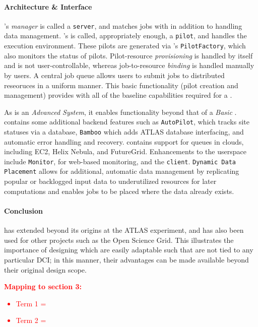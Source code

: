 \documentclass{sig-alternate}
\begin{document}
\paragraph{Architecture \& Interface}
\panda's \textit{manager} is called a \texttt{\panda server}, and matches
jobs with \pilots in addition to handling data management.
\panda's \textit{\pilot}
is called, appropriately enough, a \texttt{pilot}, and handles the execution
environment.  These pilots are generated via \panda's \texttt{PilotFactory},
which also monitors the status of pilots.
Pilot-resource \textit{provisioning} is handled by \panda itself and is not
user-controllable, whereas job-to-resource \textit{binding} is handled
manually by users.
A central job queue allows users to submit jobs
to distributed reseoruces in a uniform manner.  
This basic functionality (pilot creation and management) provides
\panda with all of the baseline capabilities required for a \pilotjob.

As \panda is an \textit{Advanced \pilotjob System}, it enables functionality
beyond that of a \textit{Basic \pilotjob}.
\panda contains some additional backend features such as \texttt{AutoPilot}, which
tracks site statuses via a database, \texttt{Bamboo} which adds
ATLAS database interfacing, and automatic error handling and recovery.
\panda contains support for queues in clouds, including EC2, Helix Nebula,
and FutureGrid.
Enhancements to the userspace include
\texttt{Monitor}, for web-based monitoring, and the \texttt{\panda client}.
\texttt{\panda Dynamic Data Placement} \cite{maeno_pd2p:_2012}
allows for additional, automatic data
management by replicating popular or backlogged input data to underutilized resources
for later computations and enables jobs to be placed where the data
already exists.


\paragraph{\panda Conclusion}
\panda has extended beyond its origins at the ATLAS experiment, and has also been used for other projects such
as the Open Science Grid.  This illustrates the importance of designing
\pilotjobs which are easily adaptable such that \pilots are not tied
to any particular DCI; in this manner, their advantages can be made
available beyond their original design scope.

\textcolor{red}
{
\textbf{Mapping to section 3:}
\begin{itemize}
\item Term 1 =
\item Term 2 =
\end{itemize}
}
\end{document}
